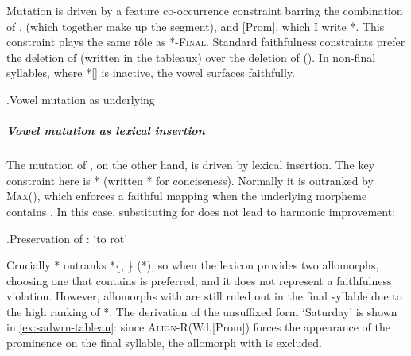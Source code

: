 Mutation is driven by a feature co\hyp occurrence constraint barring the combination of ,  (which together make up the \ipa{[ə]} segment), and [Prom], which I write *\ipa{[ə́]}. This constraint plays the same rôle as  *-\textsc{Final}\sy. Standard faithfulness constraints prefer the deletion of  (written  in the tableaux) over the deletion of  (). In non-final syllables, where *[] is inactive, the vowel surfaces faithfully.

\ex.\label{ex:cryfach-tableau}Vowel mutation as underlying \ipa{[ə]} \citep[\cfm][]{hannahs07:_const_welsh}\\

\subparagraph{Vowel mutation as lexical insertion}
\label{sec:vowel-mutation-as}

The mutation of \ipa{[u]}, on the other hand, is driven by lexical insertion. The key constraint here is * (written * for conciseness). Normally it is outranked by \textsc{Max}(), which enforces a faithful mapping when the underlying morpheme contains \ipa{[u]}. In this case, substituting \ipa{[ə]} for \ipa{[u]} does not lead to harmonic improvement:

\ex.Preservation of \ipa{[u]}: \ipa{[ˈpudri]} `to rot'\\
\begin{OTtableau}{2}
\OTcandrow[\OThand]{[ˈpudrí]}{,*}
\OTcandrow{[ˈpədrí]}{*!,}
\end{OTtableau}

Crucially * outranks *\{, \} (*\ipa{[ə]}), so when the lexicon provides two allomorphs, choosing one that contains \ipa{[ə]} is preferred, and it does not represent a faithfulness violation. However, allomorphs with \ipa{[ə]} are still ruled out in the final syllable due to the high ranking of *\ipa{[ə́]}. The derivation of the unsuffixed form \ipa{[ˈsaːdurn]} `Saturday' is shown in \ref{ex:sadwrn-tableau}: since \textsc{Align-R}(Wd{,}[Prom]) forces the appearance of the prominence on the final syllable, the allomorph with \ipa{[ə]} is excluded.

